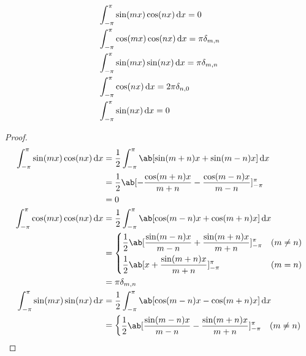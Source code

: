 \documentclass[uplatex,dvipdfmx,a4paper,11pt]{jlreq}
\begin{document}
\begin{proposition}
  \begin{align}
     & \int_{-\pi}^\pi \sin(mx)\cos(nx)\dl{x} = 0               \\
     & \int_{-\pi}^\pi \cos(mx)\cos(nx)\dl{x} = \pi\delta_{m,n} \\
     & \int_{-\pi}^\pi \sin(mx)\sin(nx)\dl{x} = \pi\delta_{m,n} \\
     & \int_{-\pi}^\pi \cos(nx)\dl{x} = 2\pi\delta_{n,0}        \\
     & \int_{-\pi}^\pi \sin(nx)\dl{x} = 0
  \end{align}
\end{proposition}
\begin{proof}
  \begin{align}
    \int_{-\pi}^\pi \sin(mx)\cos(nx)\dl{x} & = \frac{1}{2}\int_{-\pi}^\pi \ab[\sin(m + n)x + \sin(m - n)x]\dl{x}                           \\
                                           & = \frac{1}{2}\ab[- \frac{\cos(m + n)x}{m + n} - \frac{\cos(m - n)x}{m - n}]_{-\pi}^\pi        \\
                                           & = 0                                                                                           \\
    \int_{-\pi}^\pi \cos(mx)\cos(nx)\dl{x} & = \frac{1}{2}\int_{-\pi}^\pi \ab[\cos(m - n)x + \cos(m + n)x]\dl{x}                           \\
                                           & = \begin{dcases}
                                                 \frac{1}{2}\ab[\frac{\sin(m - n)x}{m - n} + \frac{\sin(m + n)x}{m + n}]_{-\pi}^\pi & (m \neq n) \\
                                                 \frac{1}{2}\ab[x + \frac{\sin(m + n)x}{m + n}]_{-\pi}^\pi                          & (m = n)
                                               \end{dcases} \\
                                           & = \pi\delta_{m,n}                                                                             \\
    \int_{-\pi}^\pi \sin(mx)\sin(nx)\dl{x} & = \frac{1}{2}\int_{-\pi}^\pi \ab[\cos(m - n)x - \cos(m + n)x]\dl{x}                           \\
                                           & = \begin{dcases}
                                                 \frac{1}{2}\ab[\frac{\sin(m - n)x}{m - n} - \frac{\sin(m + n)x}{m + n}]_{-\pi}^\pi & (m \neq n) \\

\end{dcases}
\end{align}
\end{proof}
\end{document}
